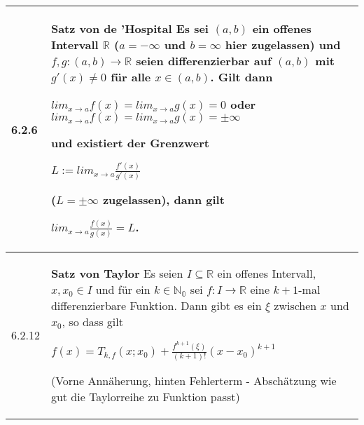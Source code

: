 \begin{table}[H]
\begin{tabularx}{\textwidth}{X m{16cm}}
        \midrule
        6.2.6 & \textbf{Satz von de 'Hospital} \hfill \break
                Es sei $(a,b)$ ein offenes Intervall $\mathbb{R}$ ($a= - \infty$ und $b = \infty$ hier zugelassen)  und $f,g:
                (a,b) \rightarrow \mathbb{R}$ seien differenzierbar auf $(a,b)$ mit $g'(x) \neq 0$ für alle $x \in (a,b)$. Gilt dann
                \hfill \break
                \centerline{$lim_{x \rightarrow a} f(x) = lim_{x \rightarrow a} g(x) = 0$ oder $lim_{x \rightarrow a} f(x) = 
                lim_{x \rightarrow a} g(x) = \pm \infty$} 
                und existiert der Grenzwert \hfill \break
                \centerline{$ L := lim_{x \rightarrow a} \frac{f'(x)}{g'(x)} $} 
                ($L = \pm \infty$ zugelassen), dann gilt \hfill \break
                \centerline{$lim_{x \rightarrow a} \frac{f(x)}{g(x)} = L$.}\\
        \midrule
        6.2.12& \textbf{Satz von Taylor} \hfill \break
                Es seien $I \subseteq \mathbb{R}$ ein offenes Intervall, $x,x_0 \in I$ und für ein $k \in \mathbb{N_0}$ sei $f:I \rightarrow \mathbb{R}$
                eine $k+1$-mal differenzierbare Funktion. Dann gibt es ein $\xi$ zwischen $x$ und $x_0$, so dass gilt \hfill \break
                \centerline{$ f(x) = T_{k,f}(x;x_0) + \frac{f^{k+1}(\xi)}{(k+1)!} (x-x_0)^{k+1} $} 
                (Vorne Annäherung, hinten Fehlerterm - Abschätzung wie gut die Taylorreihe zu Funktion passt) \\

        \bottomrule
    \end{tabularx}
    \end{table}


